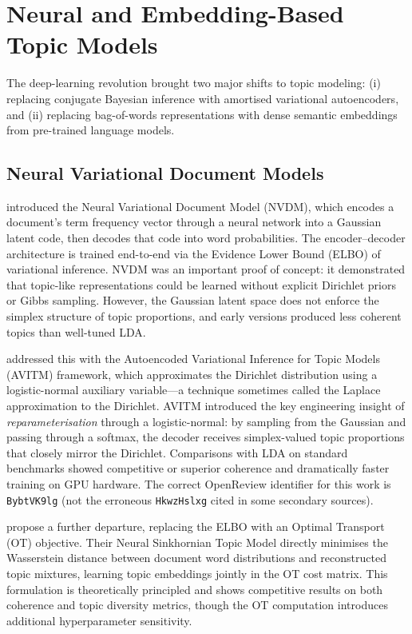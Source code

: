 \documentclass[11pt,a4paper]{article}
\begin{document}
\section{Neural and Embedding-Based Topic Models}
\label{sec:neural}

The deep-learning revolution brought two major shifts to topic modeling:
(i) replacing conjugate Bayesian inference with amortised variational
autoencoders, and (ii) replacing bag-of-words representations with
dense semantic embeddings from pre-trained language models.

\subsection{Neural Variational Document Models}
\label{sec:nvdm}

\textcite{miao2016neural} introduced the Neural Variational Document
Model (NVDM), which encodes a document's term frequency vector through
a neural network into a Gaussian latent code, then decodes that code
into word probabilities.
The encoder--decoder architecture is trained end-to-end via the
Evidence Lower Bound (ELBO) of variational inference.
NVDM was an important proof of concept: it demonstrated that topic-like
representations could be learned without explicit Dirichlet priors or
Gibbs sampling.
However, the Gaussian latent space does not enforce the simplex
structure of topic proportions, and early versions produced less
coherent topics than well-tuned LDA.

\textcite{srivastava2017autoencoding} addressed this with the
Autoencoded Variational Inference for Topic Models (AVITM) framework,
which approximates the Dirichlet distribution using a logistic-normal
auxiliary variable---a technique sometimes called the Laplace
approximation to the Dirichlet.
AVITM introduced the key engineering insight of \emph{reparameterisation}
through a logistic-normal: by sampling from the Gaussian and passing
through a softmax, the decoder receives simplex-valued topic proportions
that closely mirror the Dirichlet.
Comparisons with LDA on standard benchmarks showed competitive or
superior coherence and dramatically faster training on GPU hardware.
The correct OpenReview identifier for this work is \texttt{BybtVK9lg}
(not the erroneous \texttt{HkwzHslxg} cited in some secondary sources).

\textcite{zhao2021neural} propose a further departure, replacing the
ELBO with an Optimal Transport (OT) objective.
Their Neural Sinkhornian Topic Model directly minimises the Wasserstein
distance between document word distributions and reconstructed topic
mixtures, learning topic embeddings jointly in the OT cost matrix.
This formulation is theoretically principled and shows competitive
results on both coherence and topic diversity metrics, though the OT
computation introduces additional hyperparameter sensitivity.
\end{document}
